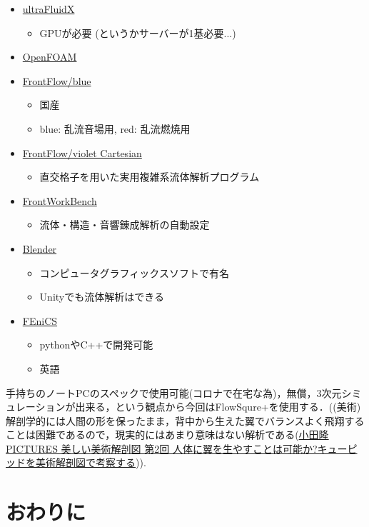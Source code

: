 \begin{itemize}
        \item \href{https://altairhyperworks.jp/product/ultrafluidx}{ultraFluidX}
            \begin{itemize}
            \item GPUが必要 (というかサーバーが1基必要...)
            \end{itemize}
        
        \item \href{https://www.openfoam.com/}{OpenFOAM}
        
        \item \href{http://www.ciss.iis.u-tokyo.ac.jp/dl/}{FrontFlow/blue}
            \begin{itemize}
            \item 国産
            \item blue: 乱流音場用,  red: 乱流燃焼用
            \end{itemize}
        
        \item \href{http://www.cenav.org/kdb/?page_id=328}{FrontFlow/violet Cartesian}
            \begin{itemize}
            \item 直交格子を用いた実用複雑系流体解析プログラム
            \end{itemize}
        
        \item \href{http://www.cenav.org/kdb/?page_id=334}{FrontWorkBench}
            \begin{itemize}
            \item 流体・構造・音響錬成解析の自動設定
            \end{itemize}
        
        \item \href{https://www.blender.org/download/}{Blender}
            \begin{itemize}
            \item コンピュータグラフィックスソフトで有名
            \item Unityでも流体解析はできる
            \end{itemize}

        \item \href{https://fenicsproject.org/}{FEniCS}
            \begin{itemize}
            \item pythonやC++で開発可能
            \item 英語
            \end{itemize}
        
        \end{itemize}

        手持ちのノートPCのスペックで使用可能(コロナで在宅な為)，無償，3次元シミュレーションが出来る，という観点から今回はFlowSqure+を使用する．((美術)解剖学的には人間の形を保ったまま，背中から生えた翼でバランスよく飛翔することは困難であるので，現実的にはあまり意味はない解析である(\href{https://genkosha.pictures/illustration/18103116710}{小田隆 PICTURES 美しい美術解剖図 第2回 人体に翼を生やすことは可能か?キューピッドを美術解剖図で考察する})).
        
\section{おわりに}
